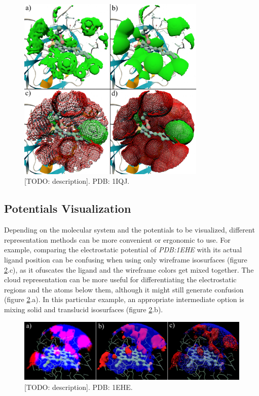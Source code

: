     \begin{figure}[H]
      \centering
      \includegraphics[width=0.8\textwidth]{figures/results/resolution.png}
      \caption{\label{fig:results/resolution} [TODO: description]. PDB: 1IQJ.}
    \end{figure}

  \subsection{Potentials Visualization}
    Depending on the molecular system and the potentials to be visualized, different representation methods can be more convenient or ergonomic to use. For example, comparing the electrostatic potential of \textit{PDB:1EHE} with its actual ligand position can be confusing when using only wireframe isosurfaces (figure \ref{fig:results/reprs_0}.c), as it ofuscates the ligand and the wireframe colors get mixed together. The cloud representation can be more useful for differentiating the electrostatic regions and the atoms below them, although it might still generate confusion (figure \ref{fig:results/reprs_0}.a). In this particular example, an appropriate intermediate option is mixing solid and translucid isosurfaces (figure \ref{fig:results/reprs_0}.b).

    \begin{figure}[H]
      \centering
      \includegraphics[width=1\textwidth]{figures/results/reprs_0.png}
      \caption{\label{fig:results/reprs_0} [TODO: description]. PDB: 1EHE.}
    \end{figure}

